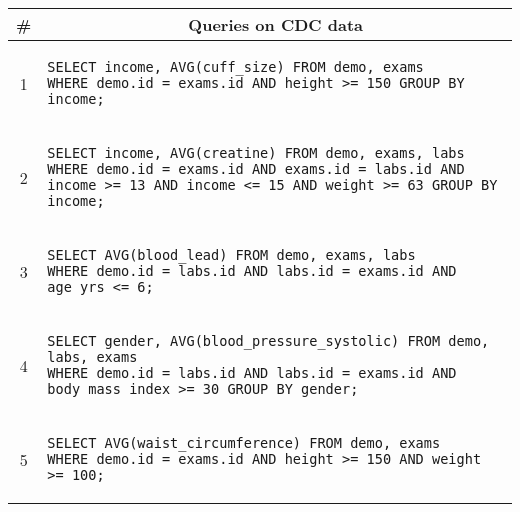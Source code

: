{
  \lstset{breaklines=true, basicstyle=\scriptsize\ttfamily}
\begin{tabular}{cl}
  \toprule
  \# & \multicolumn{1}{c}{Queries on CDC data} \\
  \midrule
  1 & 
      \begin{minipage}{6in}
\begin{lstlisting}[breaklines, basicstyle=\scriptsize\ttfamily]
SELECT income, AVG(cuff_size) FROM demo, exams 
WHERE demo.id = exams.id AND height >= 150 GROUP BY income;
\end{lstlisting}
      \end{minipage}{queryno}\label[query]{q1} \\[-1.5ex]
  2 & 
      \begin{minipage}{6in}
\begin{lstlisting}[breaklines, basicstyle=\scriptsize\ttfamily]
SELECT income, AVG(creatine) FROM demo, exams, labs
WHERE demo.id = exams.id AND exams.id = labs.id AND income >= 13 AND income <= 15 AND weight >= 63 GROUP BY income;
\end{lstlisting}
      \end{minipage}
      {queryno}\label[query]{q2} \\[-1.5ex]
  3 & 
      \begin{minipage}{6in}
\begin{lstlisting}[breaklines]
SELECT AVG(blood_lead) FROM demo, exams, labs 
WHERE demo.id = labs.id AND labs.id = exams.id AND age_yrs <= 6;
\end{lstlisting}
      \end{minipage}{queryno}\label[query]{q3}\\[-1.5ex]
  4 & 
      \begin{minipage}{6in}
\begin{lstlisting}[breaklines]
SELECT gender, AVG(blood_pressure_systolic) FROM demo, labs, exams 
WHERE demo.id = labs.id AND labs.id = exams.id AND body_mass_index >= 30 GROUP BY gender;
\end{lstlisting}
      \end{minipage}{queryno}\label[query]{q4}\\[-1.5ex]
  5 & 
      \begin{minipage}{6in}
\begin{lstlisting}[breaklines]
SELECT AVG(waist_circumference) FROM demo, exams 
WHERE demo.id = exams.id AND height >= 150 AND weight >= 100;
\end{lstlisting}

\end{minipage}
\end{tabular}}

